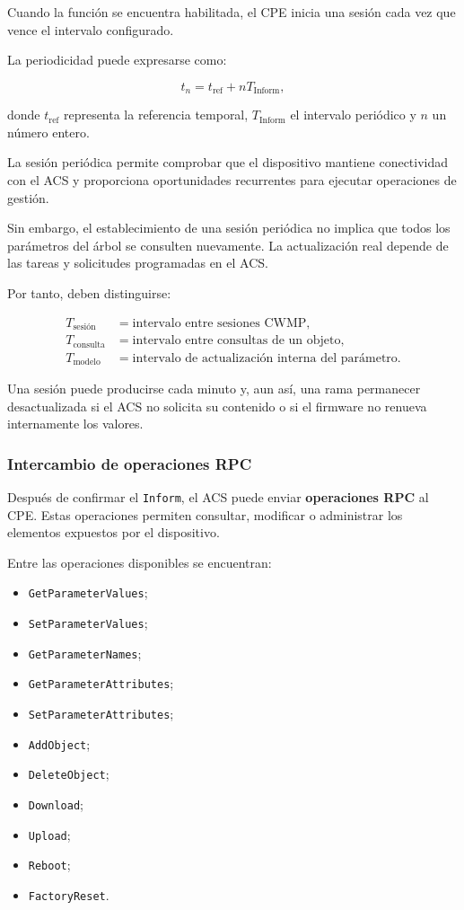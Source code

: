 Cuando la función se encuentra habilitada, el CPE inicia una sesión cada
vez que vence el intervalo configurado.

La periodicidad puede expresarse como:

\[
    t_n =
    t_{\mathrm{ref}}
    +
    nT_{\mathrm{Inform}},
\]

donde \(t_{\mathrm{ref}}\) representa la referencia temporal,
\(T_{\mathrm{Inform}}\) el intervalo periódico y \(n\) un número entero.

La sesión periódica permite comprobar que el dispositivo mantiene
conectividad con el ACS y proporciona oportunidades recurrentes para
ejecutar operaciones de gestión.

Sin embargo, el establecimiento de una sesión periódica no implica que
todos los parámetros del árbol se consulten nuevamente. La actualización
real depende de las tareas y solicitudes programadas en el ACS.

Por tanto, deben distinguirse:

\[
\begin{aligned}
    T_{\mathrm{sesión}}
    &=
    \text{intervalo entre sesiones CWMP},\\
    T_{\mathrm{consulta}}
    &=
    \text{intervalo entre consultas de un objeto},\\
    T_{\mathrm{modelo}}
    &=
    \text{intervalo de actualización interna del parámetro}.
\end{aligned}
\]

Una sesión puede producirse cada minuto y, aun así, una rama permanecer
desactualizada si el ACS no solicita su contenido o si el firmware no
renueva internamente los valores.


\subsubsection*{Intercambio de operaciones RPC}

Después de confirmar el \texttt{Inform}, el ACS puede enviar
\textbf{operaciones RPC} al CPE. Estas operaciones permiten consultar,
modificar o administrar los elementos expuestos por el dispositivo.

Entre las operaciones disponibles se encuentran:

\begin{itemize}
    \item \texttt{GetParameterValues};
    \item \texttt{SetParameterValues};
    \item \texttt{GetParameterNames};
    \item \texttt{GetParameterAttributes};
    \item \texttt{SetParameterAttributes};
    \item \texttt{AddObject};
    \item \texttt{DeleteObject};
    \item \texttt{Download};
    \item \texttt{Upload};
    \item \texttt{Reboot};
    \item \texttt{FactoryReset}.
\end{itemize}


